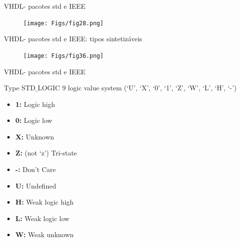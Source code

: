 \documentclass[aspectratio=169]{beamer}
\begin{document}
\begin{frame}{VHDL- pacotes std e IEEE}
	\justifying
	

	
	\begin{figure}[h]
		\centering
		\texttt{[image: Figs/fig28.png]}
	\end{figure}	
	
\end{frame}


\begin{frame}{VHDL- pacotes std e IEEE: tipos sintetizáveis}
	\justifying
	
	
	
	\begin{figure}[h]
		\centering
		\texttt{[image: Figs/fig36.png]}
	\end{figure}	
	
\end{frame}









\begin{frame}{VHDL- pacotes std e IEEE}
	\justifying
	
	\begin{block}{Type STD$\_$LOGIC}
		9 logic value system (‘U’, ‘X’, ‘0’, ‘1’, ‘Z’, ‘W’, ‘L’, ‘H’, ‘-’)
		
	\begin{itemize}
	\item \textbf{1:} Logic high    
	\item \textbf{0:} Logic low
	\item \textbf{X:} Unknown
	\item \textbf{Z:} (not ‘z’) Tri-state
	\item \textbf{-:} Don’t Care
	\item \textbf{U:} Undefined
	\item \textbf{H:} Weak logic high
	\item \textbf{L:} Weak logic low
	\item \textbf{W:} Weak unknown
	\end{itemize}		
		
		
	\end{block}
	
	
	
	

	
\end{frame}
\end{document}
